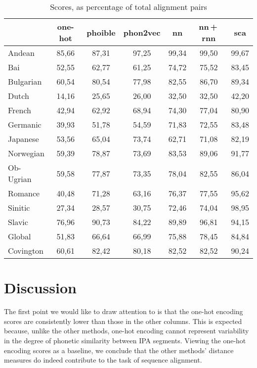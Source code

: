 \documentclass[a4paper]{report}
\begin{document}
\begin{table}[h]
	\centering\small
	\begin{tabular}{l *{6}{c}}
		\toprule
		& one-hot & phoible & phon2vec & nn & nn\,+\,rnn & sca \\
		\midrule
		Andean		&	85,66 &	87,31 &	97,25 &	99,34 &	99,50 & 99,67 \\
		Bai			&	52,55 &	62,77 &	61,25 &	74,72 &	75,52 & 83,45 \\
		Bulgarian	&	60,54 &	80,54 &	77,98 &	82,55 &	86,70 & 89,34 \\
		Dutch		&	14,16 &	25,65 &	26,00 &	32,50 &	32,50 & 42,20 \\
		French		&	42,94 &	62,92 &	68,94 &	74,30 &	77,04 & 80,90 \\
		Germanic	&	39,93 &	51,78 &	54,59 &	71,83 &	72,55 & 83,48 \\
		Japanese	&	53,56 &	65,04 &	73,74 &	62,71 &	71,08 & 82,19 \\
		Norwegian	&	59,39 &	78,87 &	73,69 &	83,53 &	89,06 & 91,77 \\
		Ob-Ugrian	&	59,58 &	77,87 &	73,35 &	78,04 &	82,55 & 86,04 \\
		Romance		&	40,48 &	71,28 &	63,16 &	76,37 &	77,55 & 95,62 \\
		Sinitic		&	27,34 &	28,57 &	30,75 &	72,46 &	74,04 & 98,95 \\
		Slavic		&	76,96 &	90,73 &	84,22 &	89,89 &	96,81 & 94,15 \\
		\addlinespace
		Global		&	51,83 &	66,64 &	66,99 &	75,88 &	78,45 & 84,84 \\
		Covington	&	60,61 &	82,42 &	80,18 &	82,52 &	82,52 & 90,24 \\
		\bottomrule
	\end{tabular}
	\caption{Scores, as percentage of total alignment pairs}
	\label{tab:results}
\end{table}


\section{Discussion}

The first point we would like to draw attention to is that the one-hot encoding scores are consistently lower than those in the other columns.
This is expected because, unlike the other methods, one-hot encoding cannot represent variability in the degree of phonetic similarity between IPA segments.
Viewing the one-hot encoding scores as a baseline, we conclude that the other methods' distance measures do indeed contribute to the task of sequence alignment.
\end{document}
